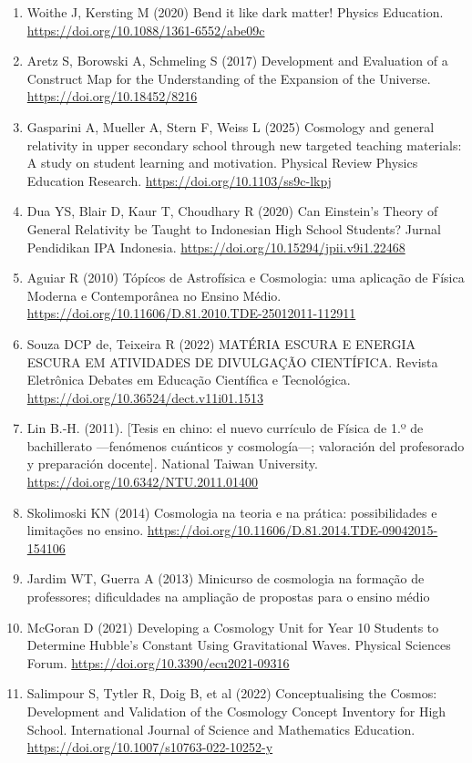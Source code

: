 {\begin{enumerate}
\item Woithe J, Kersting M (2020) Bend it like dark matter! Physics Education. \url{https://doi.org/10.1088/1361-6552/abe09c}
\item Aretz S, Borowski A, Schmeling S (2017) Development and Evaluation of a Construct Map for the Understanding of the Expansion of the Universe. \url{https://doi.org/10.18452/8216}
\item Gasparini A, Mueller A, Stern F, Weiss L (2025) Cosmology and general relativity in upper secondary school through new targeted teaching materials: A study on student learning and motivation. Physical Review Physics Education Research. \url{https://doi.org/10.1103/ss9c-lkpj}
\item Dua YS, Blair D, Kaur T, Choudhary R (2020) Can Einstein’s Theory of General Relativity be Taught to Indonesian High School Students? Jurnal Pendidikan IPA Indonesia. \url{https://doi.org/10.15294/jpii.v9i1.22468}
\item Aguiar R (2010) Tópícos de Astrofísica e Cosmologia: uma aplicação de Física Moderna e Contemporânea no Ensino Médio. \url{https://doi.org/10.11606/D.81.2010.TDE-25012011-112911}
\item Souza DCP de, Teixeira R (2022) MATÉRIA ESCURA E ENERGIA ESCURA EM ATIVIDADES DE DIVULGAÇÃO CIENTÍFICA. Revista Eletrônica Debates em Educação Científica e Tecnológica. \url{https://doi.org/10.36524/dect.v11i01.1513}
\item Lin B.-H. (2011). [Tesis en chino: el nuevo currículo de Física de 1.º de bachillerato ---fenómenos cuánticos y cosmología---; valoración del profesorado y preparación docente]. National Taiwan University. \url{https://doi.org/10.6342/NTU.2011.01400}
\item Skolimoski KN (2014) Cosmologia na teoria e na prática: possibilidades e limitações no ensino. \url{https://doi.org/10.11606/D.81.2014.TDE-09042015-154106}
\item Jardim WT, Guerra A (2013) Minicurso de cosmologia na formação de professores; dificuldades na ampliação de propostas para o ensino médio
\item McGoran D (2021) Developing a Cosmology Unit for Year 10 Students to Determine Hubble’s Constant Using Gravitational Waves. Physical Sciences Forum. \url{https://doi.org/10.3390/ecu2021-09316}
\item Salimpour S, Tytler R, Doig B, et al (2022) Conceptualising the Cosmos: Development and Validation of the Cosmology Concept Inventory for High School. International Journal of Science and Mathematics Education. \url{https://doi.org/10.1007/s10763-022-10252-y}

\end{enumerate}}
